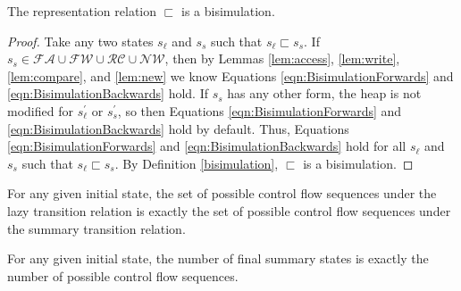 %
%
%
%

\begin{theorem}
\label{th:bisim}
The representation relation $\sqsubset$ is a bisimulation.
\end{theorem}

\begin{proof}
Take any two states $s_\ell$ and $s_s$ such that $s_\ell \sqsubset s_s$. If $s_s \in \mathcal{FA} \cup \mathcal{FW} \cup \mathcal{RC} \cup \mathcal{NW}$, then by Lemmas \ref{lem:access}, \ref{lem:write}, \ref{lem:compare}, and \ref{lem:new} we know Equations \ref{eqn:BisimulationForwards} and \ref{eqn:BisimulationBackwards} hold. If $s_s$ has any other form, the heap is not modified for $s_\ell^\prime$ or $s_s^\prime$, so then Equations \ref{eqn:BisimulationForwards} and \ref{eqn:BisimulationBackwards} hold by default. Thus, Equations \ref{eqn:BisimulationForwards} and \ref{eqn:BisimulationBackwards} hold for all  $s_\ell$ and $s_s$ such that $s_\ell \sqsubset s_s$. By Definition \ref{bisimulation}, $\sqsubset$ is a bisimulation.

\end{proof}

\begin{corollary}
For any given initial state, the set of possible control flow sequences under the lazy transition relation is exactly the set of possible control flow sequences under the summary transition relation.
\end{corollary}

\begin{corollary}
For any given initial state, the number of final summary states is exactly the number of possible control flow sequences.
\end{corollary}



